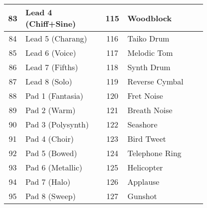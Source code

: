 \begin{tabular}{|c|p{0.4\linewidth}|c|p{0.4\linewidth}|}
	83  &  Lead 4 (Chiff+Sine) & 115  &  Woodblock \\ \hline
	84  &  Lead 5 (Charang) & 116  &  Taiko Drum \\ \hline
	85  &  Lead 6 (Voice) & 117  &  Melodic Tom \\ \hline
	86  &  Lead 7 (Fifths) & 118  &  Synth Drum \\ \hline
	87  &  Lead 8 (Solo) & 119  &  Reverse Cymbal \\ \hline
	88  &  Pad 1 (Fantasia) & 120  &  Fret Noise \\ \hline
	89  &  Pad 2 (Warm) & 121  &  Breath Noise \\ \hline
	90  &  Pad 3 (Polysynth) & 122  &  Seashore \\ \hline
	91  &  Pad 4 (Choir) & 123  &  Bird Tweet \\ \hline
	92  &  Pad 5 (Bowed) & 124  &  Telephone Ring \\ \hline
	93  &  Pad 6 (Metallic) & 125  &  Helicopter \\ \hline
	94  &  Pad 7 (Halo) & 126  &  Applause \\ \hline
	95  &  Pad 8 (Sweep) & 127  &  Gunshot \\ \hline
\end{tabular}
